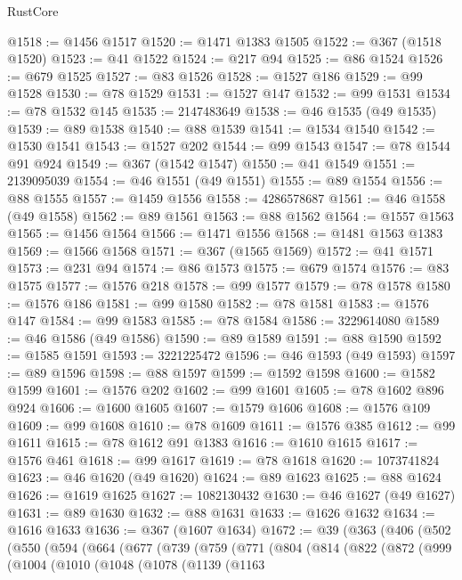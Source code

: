 \begin{lexlean}{RustCore}
\begin{coremodule}
@1518 := @1456 @1517
@1520 := @1471 @1383 @1505
@1522 := @367 (@1518 @1520)
@1523 := @41 @1522
@1524 := @217 @94
@1525 := @86 @1524
@1526 := @679 @1525
@1527 := @83 @1526
@1528 := @1527 @186
@1529 := @99 @1528
@1530 := @78 @1529
@1531 := @1527 @147
@1532 := @99 @1531
@1534 := @78 @1532 @145
@1535 := 2147483649
@1538 := @46 @1535 (@49 @1535)
@1539 := @89 @1538
@1540 := @88 @1539
@1541 := @1534 @1540
@1542 := @1530 @1541
@1543 := @1527 @202
@1544 := @99 @1543
@1547 := @78 @1544 @91 @924
@1549 := @367 (@1542 @1547)
@1550 := @41 @1549
@1551 := 2139095039
@1554 := @46 @1551 (@49 @1551)
@1555 := @89 @1554
@1556 := @88 @1555
@1557 := @1459 @1556
@1558 := 4286578687
@1561 := @46 @1558 (@49 @1558)
@1562 := @89 @1561
@1563 := @88 @1562
@1564 := @1557 @1563
@1565 := @1456 @1564
@1566 := @1471 @1556
@1568 := @1481 @1563 @1383
@1569 := @1566 @1568
@1571 := @367 (@1565 @1569)
@1572 := @41 @1571
@1573 := @231 @94
@1574 := @86 @1573
@1575 := @679 @1574
@1576 := @83 @1575
@1577 := @1576 @218
@1578 := @99 @1577
@1579 := @78 @1578
@1580 := @1576 @186
@1581 := @99 @1580
@1582 := @78 @1581
@1583 := @1576 @147
@1584 := @99 @1583
@1585 := @78 @1584
@1586 := 3229614080
@1589 := @46 @1586 (@49 @1586)
@1590 := @89 @1589
@1591 := @88 @1590
@1592 := @1585 @1591
@1593 := 3221225472
@1596 := @46 @1593 (@49 @1593)
@1597 := @89 @1596
@1598 := @88 @1597
@1599 := @1592 @1598
@1600 := @1582 @1599
@1601 := @1576 @202
@1602 := @99 @1601
@1605 := @78 @1602 @896 @924
@1606 := @1600 @1605
@1607 := @1579 @1606
@1608 := @1576 @109
@1609 := @99 @1608
@1610 := @78 @1609
@1611 := @1576 @385
@1612 := @99 @1611
@1615 := @78 @1612 @91 @1383
@1616 := @1610 @1615
@1617 := @1576 @461
@1618 := @99 @1617
@1619 := @78 @1618
@1620 := 1073741824
@1623 := @46 @1620 (@49 @1620)
@1624 := @89 @1623
@1625 := @88 @1624
@1626 := @1619 @1625
@1627 := 1082130432
@1630 := @46 @1627 (@49 @1627)
@1631 := @89 @1630
@1632 := @88 @1631
@1633 := @1626 @1632
@1634 := @1616 @1633
@1636 := @367 (@1607 @1634)
@1672 := @39
    (@363
      (@406
        (@502
          (@550
            (@594
              (@664
                (@677
                  (@739
                    (@759
                      (@771
                        (@804
                          (@814
                            (@822
                              (@872
                                (@999
                                  (@1004
                                    (@1010
                                      (@1048
                                        (@1078
                                          (@1139
                                            (@1163

\end{coremodule}
\end{lexlean}
